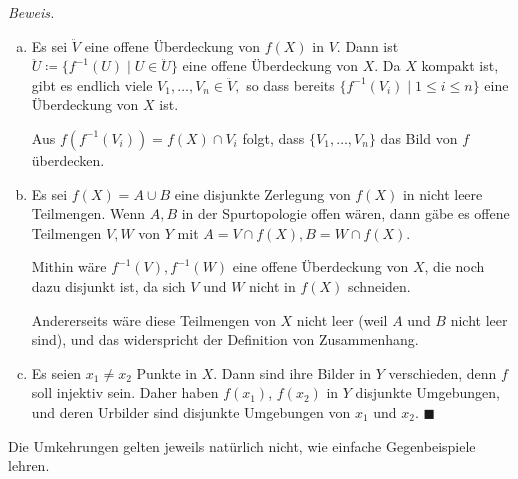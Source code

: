 \documentclass[12pt]{scrbook}   %
\newcommand{\qed}{\phantom{.}\hfill{$\blacksquare$}}
\newcommand{\da}{\coloneqq}
\begin{document}
{\it Beweis.} 
\begin{enumerate}[a)]
\item Es sei $\ddot V$ eine offene Überdeckung von $f(X)$ in $V.$ Dann
ist $\ddot U\da \{f^{-1}(U)\mid U\in \ddot U\}$ eine offene Überdeckung 
von $X.$ Da $X$ kompakt ist, gibt es endlich viele $V_1,\dots,V_n\in \ddot V,$
so dass bereits $\{f^{-1}(V_i)\mid 1\leq i\leq n\}$ eine Überdeckung von $X$ 
ist. 

Aus $f(f^{-1}(V_i)) = f(X)\cap V_i$ folgt, dass $\{V_1,\dots ,V_n\}$ das Bild
von $f$ überdecken.
\item Es sei $f(X) = A\cup B$ eine disjunkte Zerlegung von $f(X)$ in nicht 
leere Teilmengen. Wenn $A,B$ in der Spurtopologie offen wären, dann gäbe 
es offene Teilmengen $V,W$ von $Y$ mit $A=V\cap f(X), B=W\cap f(X).$

Mithin wäre $f^{-1}(V),f^{-1}(W)$ eine offene Überdeckung von $X$, die 
noch dazu disjunkt ist, da sich $V$ und $W$ nicht in $f(X)$ schneiden.

Andererseits wäre diese Teilmengen von $X$ nicht leer (weil $A$ und $B$ nicht
leer sind), und das widerspricht der Definition von Zusammenhang.

\item Es seien $x_1\neq x_2$ Punkte in $X.$ Dann sind ihre Bilder in $Y$ 
verschieden, denn $f$ soll injektiv sein. Daher haben $f(x_1)$, $f(x_2)$ in $Y$ 
disjunkte Umgebungen, und deren Urbilder sind disjunkte Umgebungen von $x_1$ 
und $x_2.$ \qed
\end{enumerate}

Die Umkehrungen gelten jeweils natürlich nicht, wie einfache Gegenbeispiele 
lehren. 
\end{document}
